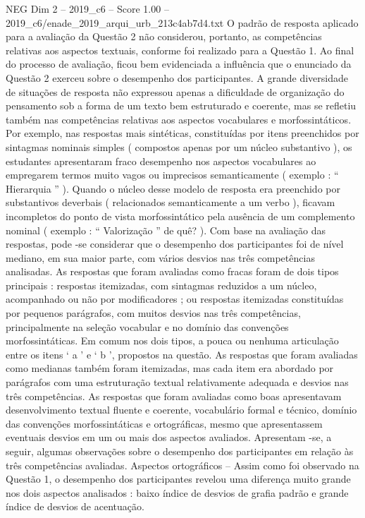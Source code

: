 \begin{textsample}{NEG Dim 2 – 2019\_c6 – Score 1.00 – 2019\_c6/enade\_2019\_arqui\_urb\_213c4ab7d4.txt}
O padrão de resposta aplicado para a avaliação da Questão 2 não considerou, portanto, as competências relativas aos aspectos textuais, conforme foi realizado para a Questão 1.
Ao final do processo de avaliação, ficou bem evidenciada a influência que o enunciado da Questão 2 exerceu sobre o desempenho dos participantes.
A grande diversidade de situações de resposta não expressou apenas a dificuldade de organização do pensamento sob a forma de um texto bem estruturado e coerente, mas se refletiu também nas competências relativas aos aspectos vocabulares e morfossintáticos.
Por exemplo, nas respostas mais sintéticas, constituídas por itens preenchidos por sintagmas nominais simples ( compostos apenas por um núcleo substantivo ), os estudantes apresentaram fraco desempenho nos aspectos vocabulares ao empregarem termos muito vagos ou imprecisos semanticamente ( exemplo : “ Hierarquia ” ).
Quando o núcleo desse modelo de resposta era preenchido por substantivos deverbais ( relacionados semanticamente a um verbo ), ficavam incompletos do ponto de vista morfossintático pela ausência de um complemento nominal ( exemplo : “ Valorização ” de quê? ).
Com base na avaliação das respostas, pode -se considerar que o desempenho dos participantes foi de nível mediano, em sua maior parte, com vários desvios nas três competências analisadas.
As respostas que foram avaliadas como fracas foram de dois tipos principais : respostas itemizadas, com sintagmas reduzidos a um núcleo, acompanhado ou não por modificadores ; ou respostas itemizadas constituídas por pequenos parágrafos, com muitos desvios nas três competências, principalmente na seleção vocabular e no domínio das convenções morfossintáticas.
Em comum nos dois tipos, a pouca ou nenhuma articulação entre os itens ‘ a ’ e ‘ b ’, propostos na questão.
As respostas que foram avaliadas como medianas também foram itemizadas, mas cada item era abordado por parágrafos com uma estruturação textual relativamente adequada e desvios nas três competências.
As respostas que foram avaliadas como boas apresentavam desenvolvimento textual fluente e coerente, vocabulário formal e técnico, domínio das convenções morfossintáticas e ortográficas, mesmo que apresentassem eventuais desvios em um ou mais dos aspectos avaliados.
Apresentam -se, a seguir, algumas observações sobre o desempenho dos participantes em relação às três competências avaliadas.
Aspectos ortográficos – Assim como foi observado na Questão 1, o desempenho dos participantes revelou uma diferença muito grande nos dois aspectos analisados : baixo índice de desvios de grafia padrão e grande índice de desvios de acentuação.

\end{textsample}
